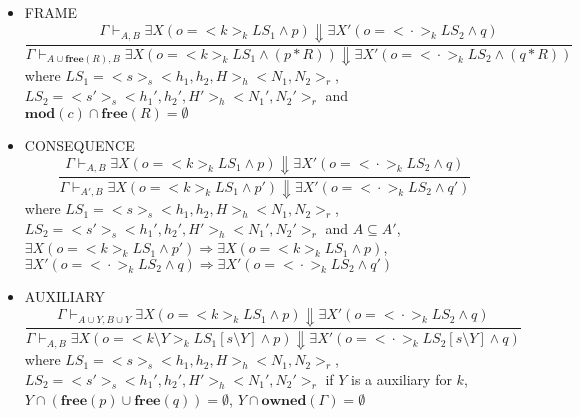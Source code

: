 \documentclass{lmcs} %
\theoremstyle{plain}\newtheorem{satz}[thm]{Satz} %
\begin{document}
\begin{itemize}
\item FRAME
$$\dfrac{\Gamma \vdash_{A,B} \exists X(o=<\!\!k\!\!>_k LS_1\land p)\Downarrow \exists X'(o=<\!\!\cdot\!\!>_k LS_2\land q)}{\Gamma \vdash_{A\cup \mathbf{free}(R),B} \exists X(o=<\!\!k\!\!>_k LS_1\land (p*R))\Downarrow \exists X'(o=<\!\!\cdot\!\!>_k LS_2\land (q*R))}$$
where $LS_1=<\!\!s\!\!>_s<\!\!h_1,h_2,H\!\!>_h<\!\!N_1,N_2\!\!>_r$, $LS_2=<\!\!s'\!\!>_s<\!\!h_1',h_2',H'\!\!>_h<\!\!N_1',N_2'\!\!>_r$ and $\mathbf{mod}(c)\cap \mathbf{free}(R)=\emptyset$
\item CONSEQUENCE
$$\dfrac{\Gamma \vdash_{A,B} \exists X(o=<\!\!k\!\!>_k LS_1\land p)\Downarrow \exists X'(o=<\!\!\cdot\!\!>_k LS_2\land q)}{\Gamma \vdash_{A',B} \exists X(o=<\!\!k\!\!>_k LS_1\land p')\Downarrow \exists X'(o=<\!\!\cdot\!\!>_k LS_2\land q')}$$
where $LS_1=<\!\!s\!\!>_s<\!\!h_1,h_2,H\!\!>_h<\!\!N_1,N_2\!\!>_r$, $LS_2=<\!\!s'\!\!>_s<\!\!h_1',h_2',H'\!\!>_h<\!\!N_1',N_2'\!\!>_r$
and $A\subseteq A'$, $\exists X(o=<\!\!k\!\!>_k LS_1\land p')\Rightarrow \exists X(o=<\!\!k\!\!>_k LS_1\land p)$, $\exists X'(o=<\!\!\cdot\!\!>_k LS_2\land q)\Rightarrow \exists X'(o=<\!\!\cdot\!\!>_k LS_2\land q')$
\item AUXILIARY
$$\dfrac{\Gamma \vdash_{A\cup Y,B\cup Y} \exists X(o=<\!\!k\!\!>_k LS_1\land p)\Downarrow \exists X'(o=<\!\!\cdot\!\!>_k LS_2\land q)}{\Gamma \vdash_{A,B} \exists X(o=<\!\!k\setminus Y \!\!>_k LS_1[s\setminus Y]\land p)\Downarrow \exists X'(o=<\!\!\cdot\!\!>_k LS_2[s\setminus Y]\land q)}$$
where $LS_1=<\!\!s\!\!>_s<\!\!h_1,h_2,H\!\!>_h<\!\!N_1,N_2\!\!>_r$, $LS_2=<\!\!s'\!\!>_s<\!\!h_1',h_2',H'\!\!>_h<\!\!N_1',N_2'\!\!>_r$
if $Y$ is a auxiliary for $k$, $Y\cap (\mathbf{free}(p)\cup \mathbf{free}(q))=\emptyset$, $Y\cap \mathbf{owned}(\Gamma)=\emptyset$
\end{itemize}
\end{document}
